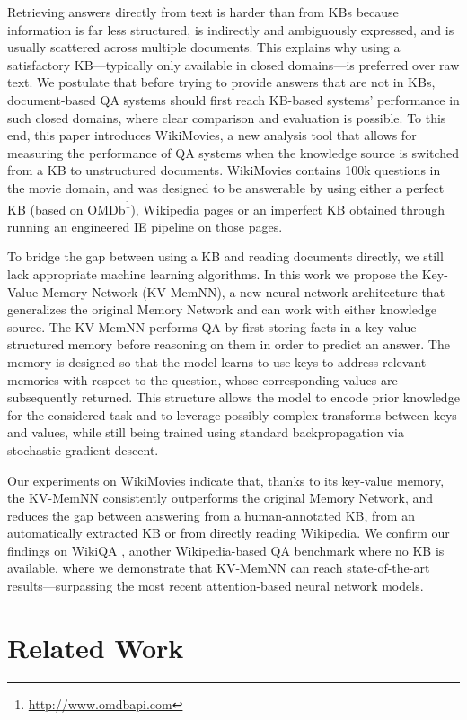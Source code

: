 \documentclass[11pt,letterpaper]{article}
\begin{document}
Retrieving answers directly from text is harder than
from KBs because information is far less structured, is
indirectly and ambiguously expressed, and is usually scattered across multiple documents.
This explains why using a satisfactory KB---typically only available in closed domains---is preferred over raw text.
We postulate that before trying to provide answers that are not in
KBs, document-based QA systems should first reach KB-based systems'
performance in such closed domains, where clear comparison and
evaluation is possible.
To this end, this paper introduces {\sc WikiMovies}, a new
analysis tool that allows for measuring the performance of QA systems when the knowledge source is switched from a KB to unstructured documents.
{\sc WikiMovies} contains 100k questions in the movie domain, and was designed
to be answerable by using either a perfect KB
(based on OMDb\footnote{\url{http://www.omdbapi.com}}), Wikipedia pages or an imperfect KB obtained through
running an engineered IE pipeline on those pages.

To bridge the gap between using a KB and reading documents directly,
we still lack appropriate machine learning algorithms. In this
work we propose the Key-Value Memory Network (KV-MemNN), a new neural network
architecture that generalizes the original Memory Network
\citep{sukhbaatar2015end} and can work with either knowledge source.
The KV-MemNN performs QA by first storing facts in a key-value
structured memory before reasoning on them in order to predict an
answer. The memory is designed so that the model learns to use keys to
address relevant memories with respect to the question, whose corresponding values are subsequently returned.
This structure allows the model to encode prior knowledge for the considered task
and to leverage possibly complex transforms between keys and values,
while still being trained using standard backpropagation via
stochastic gradient descent.

Our experiments on {\sc WikiMovies} indicate that, thanks to its key-value memory,
the KV-MemNN consistently outperforms the
original Memory Network, and reduces the gap between answering from a human-annotated KB,
from an automatically extracted KB or from directly reading Wikipedia.
We confirm our findings on  {\sc WikiQA} \citep{yang2015wikiqa},
another Wikipedia-based QA benchmark where no KB is available,
where we demonstrate that KV-MemNN can reach state-of-the-art results---surpassing
the most recent attention-based neural network models.
 
\section{Related Work}
\vspace{-0.5ex}
\end{document}
